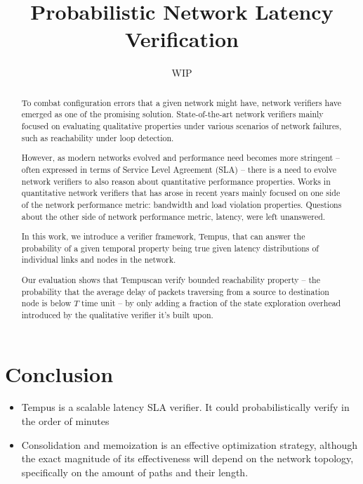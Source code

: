 \documentclass[10pt,sigconf,letterpaper,anonymous,nonacm]{acmart}
\title{Probabilistic Network Latency Verification}
\author{WIP}
\newcommand{\tool}[0]{Tempus}
\begin{document}
\begin{abstract}
    To combat configuration errors that a given network might have, network verifiers have emerged as 
    one of the promising solution. 
    State-of-the-art network verifiers mainly focused on evaluating qualitative properties under 
    various scenarios of network failures, such as reachability under loop detection. 
    
    However, as modern networks evolved and performance need becomes more stringent -- often 
    expressed in terms of Service Level Agreement (SLA) -- there is a need to evolve network 
    verifiers to also reason about quantitative performance properties. 
    Works in quantitative network verifiers that has arose in recent years mainly focused on one 
    side of the network performance metric: bandwidth and load violation properties. 
    Questions about the other side of network performance metric, latency, were left unanswered. 

    In this work, we introduce a verifier framework, Tempus, that can answer the probability of 
    a given temporal property being true given latency distributions of individual links and 
    nodes in the network. 
    
    Our evaluation shows that \tool can verify bounded reachability property -- the probability
    that the average delay of packets traversing from a source to destination node is below $T$
    time unit -- by only adding a fraction of the state exploration overhead introduced by the 
    qualitative verifier it's built upon.
\end{abstract}

\maketitle
















\section{Conclusion}
\begin{itemize}
    \item Tempus is a scalable latency SLA verifier. It could probabilistically verify in the order of minutes
    \item Consolidation and memoization is an effective optimization strategy, although the exact magnitude of 
        its effectiveness will depend on the network topology, specifically on the amount of paths and their 
        length.
\end{itemize}



\end{document}
